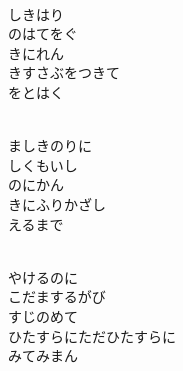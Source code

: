 \documentclass[10pt,b5j]{tarticle} %
\begin{document}
\vspace{1.5em} %
\newcommand{\linespace}{0.5em} %
\newcommand{\blocksize}{0.5\hsize} %
\newcommand{\itemmargin}{3em} %
\begin{enumerate} %
    \setlength{\itemindent}{\itemmargin} %
    \begin{minipage}[c]{\blocksize}
    
        \vspace{\linespace}
        \item~\\
        しきはり\\
        のはてをぐ\\
        きにれん\\
        きすさぶをつきて\\
        をとはく
        
        \vspace{\linespace}
        \item~\\
        ましきのりに\\
        しくもいし\\
        のにかん\\
        きにふりかざし\\
        えるまで
        
    \end{minipage}
    \begin{minipage}[c]{\blocksize}
        
        \vspace{\linespace}
        \item~\\
        やけるのに\\
        こだまするがび\\
        すじのめて\\
        ひたすらにただひたすらに\\
        みてみまん
        

\end{minipage}
\end{enumerate}
\end{document}
